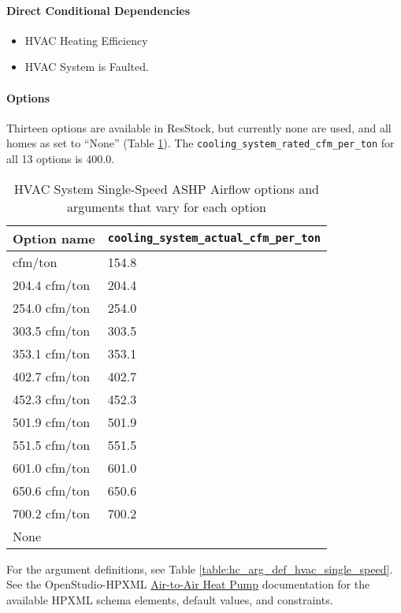 \paragraph{Direct Conditional Dependencies}
\begin{itemize}
    \item HVAC Heating Efficiency
    \item HVAC System is Faulted.
\end{itemize}
\paragraph{Options}
 Thirteen options are available in ResStock, but currently none are used, and all homes as set to ``None'' (Table \ref{table:hc_opt_hvac_single_speed}). The \texttt{cooling\_system\_rated\_cfm\_per\_ton} for all 13 options is 400.0. 

\begin{longtable}[]{|p{3.5cm}|p{}|}\caption{HVAC System Single-Speed ASHP Airflow options and arguments that vary for each option} \label{table:hc_opt_hvac_single_speed} \\
\toprule\noalign{}
Option name &
\texttt{cooling\_system\_actual\_cfm\_per\_ton} \\
\midrule\noalign{}
\endhead
\bottomrule\noalign{}
\endlastfoot
154.8 cfm/ton  & 154.8 \\
204.4 cfm/ton & 204.4 \\
254.0 cfm/ton & 254.0 \\
303.5 cfm/ton & 303.5 \\
353.1 cfm/ton & 353.1 \\
402.7 cfm/ton & 402.7 \\
452.3 cfm/ton & 452.3 \\
501.9 cfm/ton & 501.9 \\
551.5 cfm/ton & 551.5 \\
601.0 cfm/ton & 601.0 \\
650.6 cfm/ton & 650.6 \\
700.2 cfm/ton & 700.2 \\
None & \\
\end{longtable}

For the argument definitions, see Table \ref{table:hc_arg_def_hvac_single_speed}. See the OpenStudio-HPXML \href{https://openstudio-hpxml.readthedocs.io/en/v1.8.1/workflow_inputs.html#air-to-air-heat-pump}{Air-to-Air Heat Pump} documentation for the available HPXML schema elements, default values, and constraints.

